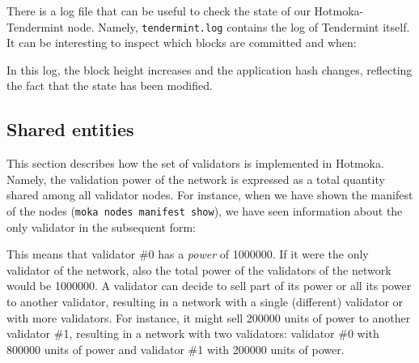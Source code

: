 There is a log file that can be useful to check the state of our Hotmoka-Tendermint node.
Namely, \texttt{tendermint.log} contains the log of Tendermint itself. It can be interesting
to inspect which blocks are committed and when:
%
\begin{shellbox}\begin{ttlst}
I[2025-06-11|10:13:24.143] Version info, module=main
  tendermint_version=@tendermint_version block=11 p2p=8
I[2025-06-11|10:13:24.169] Started node module=main
  nodeInfo="{ProtocolVersion:{P2P:8 Block:11 App:0}
I[2025-06-11|10:13:25.234] executed block module=state
  height=630 num_valid_txs=2 num_invalid_txs=0
I[2025-06-11|10:13:25.408] committed state module=state
  height=630 num_txs=0
  app_hash=A30F89457141AB7E94F71456871396FD9D30CA8E9F66998C6E3E3079D40849F
\end{ttlst}\end{shellbox}
%
In this log, the block height increases and the application hash changes,
reflecting the fact that the state has been modified.

\subsection{Shared entities}\label{subsec:shared_entities}

This section describes how the set of validators
is implemented in Hotmoka. Namely, the validation power of the network is expressed as a
total quantity shared among all validator nodes. For instance, when we have shown the manifest of the
nodes (\texttt{moka nodes manifest show}), we have seen information about the only validator in the subsequent form:
%
\begin{shellbox}\end{shellbox}
%
This means that validator \#0 has a \emph{power} of 1000000. If it were the only validator of the network,
also the total power of the validators of the network would be 1000000.
A validator can decide to sell part of its power or all its power to
another validator, resulting in a network with a single (different) validator or with more validators.
For instance, it might sell 200000 units of power to another validator \#1, resulting
in a network with two validators: validator \#0 with 800000 units of power and
validator \#1 with 200000 units of power.

